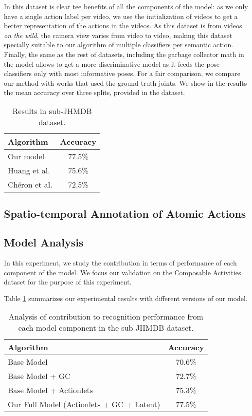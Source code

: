 In this dataset is clear tee benefits of all the components of the model: as we only have a single action label per video, we use the initialization of videos to get a better representation of the actions in the videos. As this dataset is from videos \emph{on the wild}, the camera view varies from video to video, making this dataset specially suitable to our algorithm of multiple classifiers per semantic action. Finally, the same as the rest of datasets, including the garbage collector math in the model allows to get a more discriminative model as it feeds the pose classifiers only with most informative poses. For a fair comparison, we compare our method with works that used the ground truth joints. We show in the results the mean accuracy over three splits, provided in the dataset.

\begin{table}
\centering
\begin{tabular}{|l|c|}
\hline
\textbf{Algorithm} & \textbf{Accuracy}\\
\hline
Our model &  77.5\% \\
\hline
Huang et al. \cite{Jhuang2013} & 75.6\% \\
Ch\'eron et al. \cite{Cheron2015} & 72.5\%\\
\hline
\end{tabular}
\caption{Results in sub-JHMDB dataset. }
\end{table}


\subsection{Spatio-temporal Annotation of Atomic Actions}

\subsection{Model Analysis}
In this experiment,
we study the contribution in terms of performance of each component of the
model.
We focus our validation on the Composable Activities dataset for the purpose
of this experiment.

Table \ref{tab:components} summarizes our experimental results with different
versions of our model.

\begin{table}
\centering
\begin{tabular}{|l|c|}
\hline
\textbf{Algorithm} & \textbf{Accuracy}\\
\hline
Base Model & 70.6\%\\
Base Model + GC & 72.7\% \\
Base Model + Actionlets & 75.3\%\\
Our Full Model (Actionlets + GC + Latent) &  77.5\% \\
\hline
\end{tabular}
\caption{Analysis of contribution to recognition performance from
each model component in the sub-JHMDB dataset.}
\label{tab:components}
\end{table}




